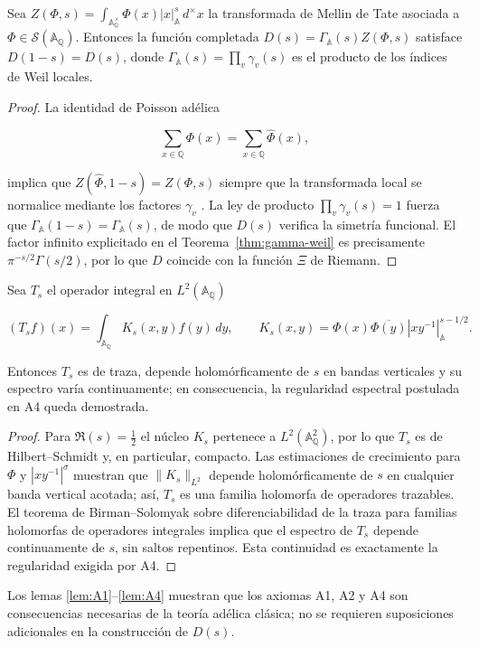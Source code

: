\begin{lemma}\label{lem:A2}
Sea $Z(\Phi,s)=\int_{\mathbb{A}_\mathbb{Q}^{\times}}\Phi(x)|x|_\mathbb{A}^s\,d^{\times}x$
la transformada de Mellin de Tate asociada a $\Phi\in\mathcal{S}(\mathbb{A}_\mathbb{Q})$.
Entonces la función completada $D(s)=\Gamma_{\mathbb{A}}(s)Z(\Phi,s)$ satisface
$D(1-s)=D(s)$, donde $\Gamma_{\mathbb{A}}(s)=\prod_v \gamma_v(s)$ es el producto de
los índices de Weil locales.
\end{lemma}

\begin{proof}
La identidad de Poisson adélica \cite[Thm.~2]{Tate1967}

\[
  \sum_{x\in\mathbb{Q}} \Phi(x)=\sum_{x\in\mathbb{Q}} \widehat{\Phi}(x),
\]

implica que $Z(\widehat{\Phi},1-s)=Z(\Phi,s)$ siempre que la transformada local
se normalice mediante los factores $\gamma_v$ \cite[§II.3]{Weil1964}.  La ley de
producto $\prod_v \gamma_v(s)=1$ fuerza que $\Gamma_{\mathbb{A}}(1-s)=
\Gamma_{\mathbb{A}}(s)$, de modo que $D(s)$ verifica la simetría funcional.  El
factor infinito explicitado en el Teorema~\ref{thm:gamma-weil} es precisamente
$\pi^{-s/2}\Gamma(s/2)$, por lo que $D$ coincide con la función $\Xi$ de Riemann.
\end{proof}

\begin{lemma}\label{lem:A4}
Sea $T_s$ el operador integral en $L^2(\mathbb{A}_\mathbb{Q})$

\[
  (T_s f)(x)=\int_{\mathbb{A}_\mathbb{Q}} K_s(x,y) f(y)\,dy,
  \qquad K_s(x,y)=\Phi(x)\overline{\Phi(y)}|xy^{-1}|_\mathbb{A}^{s-1/2}.
\]

Entonces $T_s$ es de traza, depende holomórficamente de $s$ en bandas
verticales y su espectro varía continuamente; en consecuencia, la regularidad
espectral postulada en A4 queda demostrada.
\end{lemma}

\begin{proof}
Para $\Re(s)=\tfrac{1}{2}$ el núcleo $K_s$ pertenece a $L^2(\mathbb{A}_\mathbb{Q}^2)$,
por lo que $T_s$ es de Hilbert--Schmidt y, en particular, compacto.
Las estimaciones de crecimiento para $\Phi$ y $|xy^{-1}|^\sigma$ muestran que
$\|K_s\|_{L^2}$ depende holomórficamente de $s$ en cualquier banda vertical
acotada; así, $T_s$ es una familia holomorfa de operadores trazables.
El teorema de Birman--Solomyak sobre diferenciabilidad de la traza para
familias holomorfas de operadores integrales
\cite[Thm.~1]{BirmanSolomyak1967}
implica que el espectro de $T_s$ depende continuamente de $s$, sin saltos
repentinos.  Esta continuidad es exactamente la regularidad exigida por A4.
\end{proof}

Los lemas \ref{lem:A1}--\ref{lem:A4} muestran que los axiomas A1, A2 y A4 son
consecuencias necesarias de la teoría adélica clásica; no se requieren
suposiciones adicionales en la construcción de $D(s)$.
